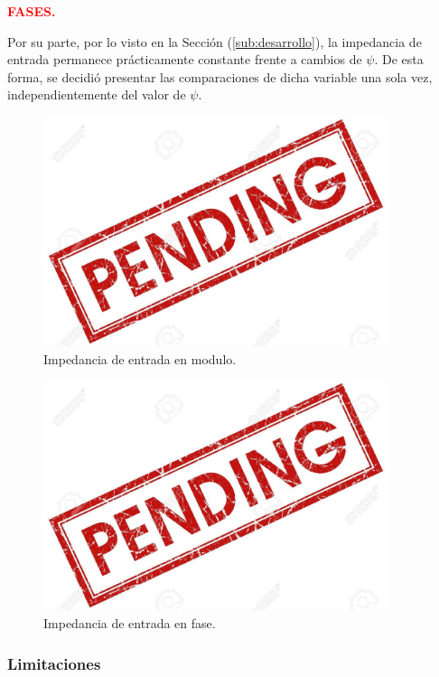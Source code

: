 \begin{center}
	\textcolor{red}{\textbf{FASES.}}
\end{center}

Por su parte, por lo visto en la Sección (\ref{sub:desarrollo}), la impedancia de entrada permanece prácticamente constante frente a cambios de $\psi$. De esta forma, se decidió presentar las comparaciones de dicha variable una sola vez, independientemente del valor de $\psi$.
\begin{figure}[H]	
	\centering
	\includegraphics[width=0.9\textwidth]{Imagenes/ZinCompMod.png}
	\caption{Impedancia de entrada en modulo.}
	\label{fig:ZinCompMod}
\end{figure}
\begin{figure}[H]	
	\centering
	\includegraphics[width=0.9\textwidth]{Imagenes/ZinCompPh.png}
	\caption{Impedancia de entrada en fase.}
	\label{fig:ZinCompPh}
\end{figure}

\subsubsection{Limitaciones}

